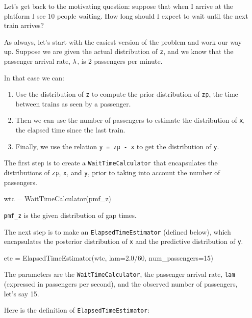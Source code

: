 \documentclass[12pt]{book}
\theoremstyle{exercise}
\newcommand{\py}[1]{{\tt #1}}%
\begin{document}
Let's get back to the motivating question: suppose that when
I arrive at the platform I see 10 people waiting.
How long should I expect to wait until the next train arrives?

As always, let's start with the easiest version of the problem
and work our way up.  Suppose we are given the actual distribution of
\py{z}, and we know that the passenger arrival rate,
$\mathtt{\lambda}$, is 2 passengers per minute.

In that case we can:

\begin{enumerate}

\item Use the distribution of \py{z} to compute
the prior distribution of \py{zp}, the time between trains
as seen by a passenger.

\item Then we can use the number of passengers to estimate the distribution
of \py{x}, the elapsed time since the last train.

\item Finally, we use the relation \py{y = zp - x} to get the
distribution of \py{y}.

\end{enumerate}

The first step is to create a \py{WaitTimeCalculator} that
encapsulates the distributions of \py{zp}, \py{x},
and \py{y}, prior to taking into account the number of
passengers.

\begin{code}
    wtc = WaitTimeCalculator(pmf_z)
\end{code}

\verb"pmf_z" is the given distribution of gap times.

The next step is to make an \py{ElapsedTimeEstimator} (defined
below), which encapsulates the posterior distribution of \py{x} and
the predictive distribution of \py{y}.

\begin{code}
    ete = ElapsedTimeEstimator(wtc,
                               lam=2.0/60,
                               num_passengers=15)
\end{code}

The parameters are the \py{WaitTimeCalculator}, the passenger
arrival rate, \py{lam} (expressed in passengers per second),
and the observed number of passengers, let's say 15.

Here is the definition of \py{ElapsedTimeEstimator}:
\end{document}
